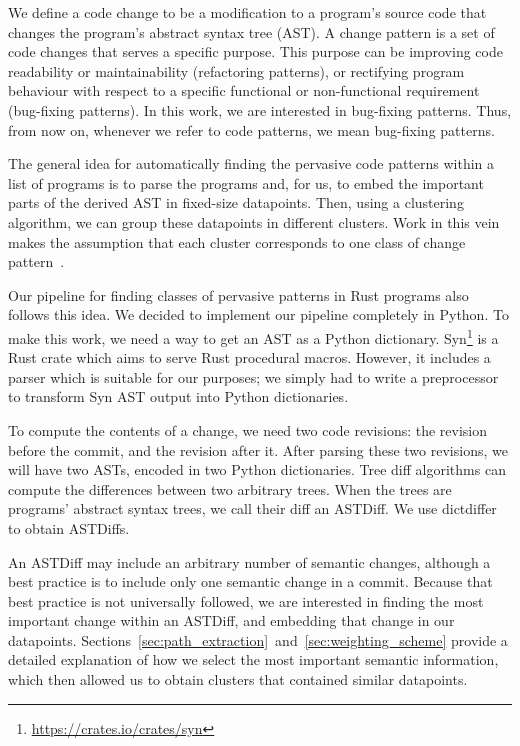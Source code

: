 We define a code change to be a modification to a program's source code that changes the program's abstract syntax tree (AST). A change pattern is a set of code changes that serves a specific purpose. This purpose can be improving code readability or maintainability (refactoring patterns), or rectifying program behaviour with respect to a specific functional or non-functional requirement (bug-fixing patterns). In this work, we are interested in bug-fixing patterns. Thus, from now on, whenever we refer to code patterns, we mean bug-fixing patterns.

The general idea for automatically finding the pervasive code patterns within a list of programs is to parse the programs and, for us, to embed the important parts of the derived AST in fixed-size datapoints. Then, using a clustering algorithm, we can group these datapoints in different clusters. Work in this vein makes the assumption that each cluster corresponds to one class of change pattern~\cite{hanam2016discovering,campos2019discovering,yang2022mining}.

Our pipeline for finding classes of pervasive patterns in Rust programs also follows this idea. We decided to implement our pipeline completely in Python. To make this work, we need a way to get an AST as a Python dictionary. Syn\footnote{\url{https://crates.io/crates/syn}} is a Rust crate which aims to serve Rust procedural macros. However, it includes a parser which is suitable for our purposes; we simply had to write a preprocessor to transform Syn AST output into Python dictionaries.

To compute the contents of a change, we need two code revisions: the revision before the commit, and the revision after it. After parsing these two revisions, we will have two ASTs, encoded in two Python dictionaries. Tree diff algorithms can compute the differences between two arbitrary trees. When the trees are programs' abstract syntax trees, we call their diff an ASTDiff. We use dictdiffer to obtain ASTDiffs.

An ASTDiff may include an arbitrary number of semantic changes, although a best practice is to include only one semantic change in a commit. Because that best practice is not universally followed, we are interested in finding the most important change within an ASTDiff, and embedding that change in our datapoints. Sections~\ref{sec:path_extraction}~and~\ref{sec:weighting_scheme} provide a detailed explanation of how we select the most important semantic information, which then allowed us to obtain clusters that contained similar datapoints. 

